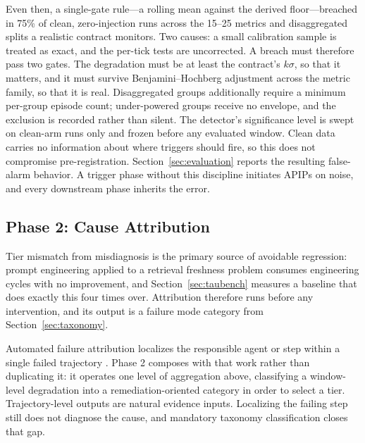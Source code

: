 \documentclass[conference]{IEEEtran}
\begin{document}
Even then, a single-gate rule---a rolling mean against the derived
floor---breached in 75\% of clean, zero-injection runs across the 15--25
metrics and disaggregated splits a realistic contract monitors.
Two causes: a small calibration sample is treated as exact, and the per-tick
tests are uncorrected. A breach must therefore pass two gates. The degradation
must be at least the contract's $k\sigma$, so that it matters, and it must
survive Benjamini--Hochberg adjustment across the metric family, so that it is
real. Disaggregated groups additionally require a minimum per-group episode
count; under-powered groups receive no envelope, and the exclusion is recorded
rather than silent. The detector's significance level is swept on clean-arm
runs only and frozen before any evaluated window. Clean data carries no
information about where triggers should fire, so this does not compromise
pre-registration. Section~\ref{sec:evaluation} reports the resulting
false-alarm behavior. A trigger phase without this discipline initiates APIPs
on noise, and every downstream phase inherits the error.

\subsection{Phase 2: Cause Attribution}
\label{sec:attribution}

Tier mismatch from misdiagnosis is the primary source of avoidable regression:
prompt engineering applied to a retrieval freshness problem consumes
engineering cycles with no improvement, and Section~\ref{sec:taubench} measures
a baseline that does exactly this four times over. Attribution therefore runs
before any intervention, and its output is a failure mode category from
Section~\ref{sec:taxonomy}.

Automated failure attribution localizes the responsible agent or step within a
single failed trajectory \cite{zhu2026, ma2025attribution, zhang2025,
agenttrace2026}. Phase 2 composes with that work rather than duplicating it: it
operates one level of aggregation above, classifying a window-level degradation
into a remediation-oriented category in order to select a tier.
Trajectory-level outputs are natural evidence inputs. Localizing the failing
step still does not diagnose the cause, and mandatory taxonomy classification
closes that gap.
\end{document}

